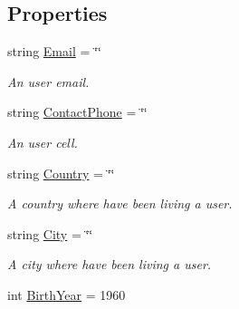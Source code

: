 \subsection*{Properties}
\begin{DoxyCompactItemize}
\item 
string \mbox{\hyperlink{class_wpf_handler_1_1_u_i_1_1_controls_1_1_logon_1_1_advanced_registration_panel_descriptor_ae8a21fc8856329480880595b0942afe7}{Email}} = \char`\"{}\char`\"{}
\begin{DoxyCompactList}\small\item\em An user email. \end{DoxyCompactList}\item 
string \mbox{\hyperlink{class_wpf_handler_1_1_u_i_1_1_controls_1_1_logon_1_1_advanced_registration_panel_descriptor_a025efd3270fd44b0a8aafa7aa01fb50b}{Contact\+Phone}} = \char`\"{}\char`\"{}
\begin{DoxyCompactList}\small\item\em An user cell. \end{DoxyCompactList}\item 
string \mbox{\hyperlink{class_wpf_handler_1_1_u_i_1_1_controls_1_1_logon_1_1_advanced_registration_panel_descriptor_a4fd87d8eab706d490c23ce21cbac3507}{Country}} = \char`\"{}\char`\"{}
\begin{DoxyCompactList}\small\item\em A country where have been living a user. \end{DoxyCompactList}\item 
string \mbox{\hyperlink{class_wpf_handler_1_1_u_i_1_1_controls_1_1_logon_1_1_advanced_registration_panel_descriptor_a5918a7c8d33623d3cf9bc0bba7c295a2}{City}} = \char`\"{}\char`\"{}
\begin{DoxyCompactList}\small\item\em A city where have been living a user. \end{DoxyCompactList}\item 
int \mbox{\hyperlink{class_wpf_handler_1_1_u_i_1_1_controls_1_1_logon_1_1_advanced_registration_panel_descriptor_a22e104a6aa8557c53ac8ab6bd53a3a0b}{Birth\+Year}} = 1960

\end{DoxyCompactItemize}
